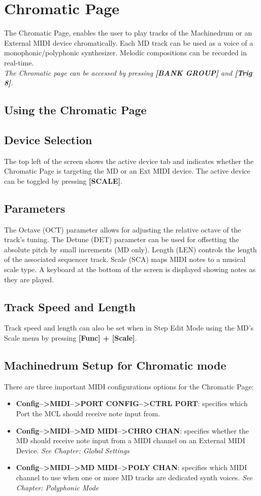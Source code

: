 \chapter{Chromatic Page}
The Chromatic Page, enables the user to play tracks of the Machinedrum or an External MIDI device chromatically. Each MD track can be used as a voice of a monophonic/polyphonic synthesizer. Melodic compositions can be recorded in real-time.
\\
\textit{The Chromatic page can be accessed by pressing \textbf{[BANK GROUP]} and \textbf{[Trig 8]}.}
\\
\section{Using the Chromatic Page}
\section{Device Selection}
The top left of the screen shows the active device tab and indicates whether the Chromatic Page is targeting the MD or an Ext MIDI device. The active device can be toggled by pressing \textbf{[SCALE]}.
\newpage
\section{Parameters}
The Octave (OCT) parameter allows for adjusting the relative octave of the track's tuning. The Detune (DET) parameter can be used for offsetting the absolute pitch by small increments (MD only). Length (LEN) controls the length of the associated sequencer track. Scale (SCA) maps MIDI notes to a musical scale type.
A keyboard at the bottom of the screen is displayed showing notes as they are played.
\section{Track Speed and Length}
Track speed and length can also be set when in Step Edit Mode using the MD's Scale menu by pressing \textbf{[Func] + [Scale]}.
\section{Machinedrum Setup for Chromatic mode}
There are three important MIDI configurations options for the Chromatic Page:
\begin{itemize}
    \item \textbf{Config-->MIDI-->PORT CONFIG-->CTRL PORT}: specifies which Port the MCL should receive note input from. 
    \item \textbf{Config-->MIDI-->MD MIDI-->CHRO CHAN}: specifies whether the MD should receive note input from a MIDI channel on an External MIDI Device. \textit{See Chapter: Global Settings}
    \item \textbf{Config-->MIDI-->MD MIDI-->POLY CHAN}: specifies which MIDI channel to use when one or more MD tracks are dedicated synth voices. \textit{See Chapter: Polyphonic Mode} 
\end{itemize}

